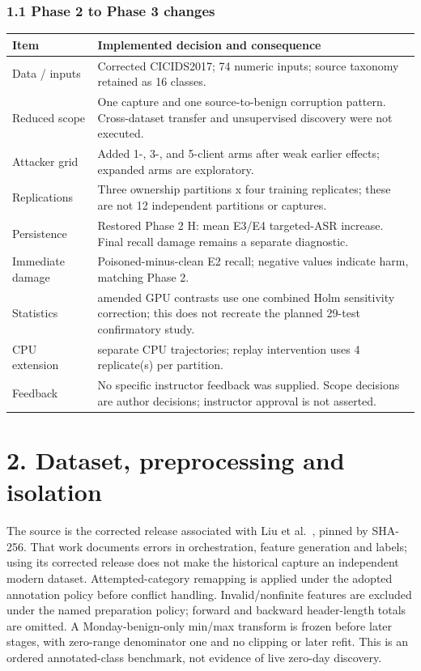 \documentclass[
  10pt,
  a4paper,
]{article}
\begin{document}
\hypertarget{phase-2-to-phase-3-changes}{%
\subsubsection{1.1 Phase 2 to Phase 3
changes}\label{phase-2-to-phase-3-changes}}

\begin{longtable}[]{@{}
  >{\raggedright\arraybackslash}p{}
  >{\raggedright\arraybackslash}p{}@{}}
\toprule
Item & Implemented decision and consequence \\
\midrule
\endhead
Data / inputs & Corrected CICIDS2017; 74 numeric inputs; source taxonomy
retained as 16 classes. \\
Reduced scope & One capture and one source-to-benign corruption pattern.
Cross-dataset transfer and unsupervised discovery were not executed. \\
Attacker grid & Added 1-, 3-, and 5-client arms after weak earlier
effects; expanded arms are exploratory. \\
Replications & Three ownership partitions x four training replicates;
these are not 12 independent partitions or captures. \\
Persistence & Restored Phase 2 H: mean E3/E4 targeted-ASR increase.
Final recall damage remains a separate diagnostic. \\
Immediate damage & Poisoned-minus-clean E2 recall; negative values
indicate harm, matching Phase 2. \\
Statistics & 47 amended GPU contrasts use one combined Holm sensitivity
correction; this does not recreate the planned 29-test confirmatory
study. \\
CPU extension & 57 separate CPU trajectories; replay intervention uses 4
replicate(s) per partition. \\
Feedback & No specific instructor feedback was supplied. Scope decisions
are author decisions; instructor approval is not asserted. \\
\bottomrule
\end{longtable}

\hypertarget{dataset-preprocessing-and-isolation}{%
\section{2. Dataset, preprocessing and
isolation}\label{dataset-preprocessing-and-isolation}}

The source is the corrected release associated with Liu et al.~\cite{liu},
pinned by SHA-256. That work documents errors in orchestration, feature
generation and labels; using its corrected release does not make the
historical capture an independent modern dataset. Attempted-category
remapping is applied under the adopted annotation policy before conflict
handling. Invalid/nonfinite features are excluded under the named
preparation policy; forward and backward header-length totals are
omitted. A Monday-benign-only min/max transform is frozen before later
stages, with zero-range denominator one and no clipping or later refit.
This is an ordered annotated-class benchmark, not evidence of live
zero-day discovery.
\end{document}
